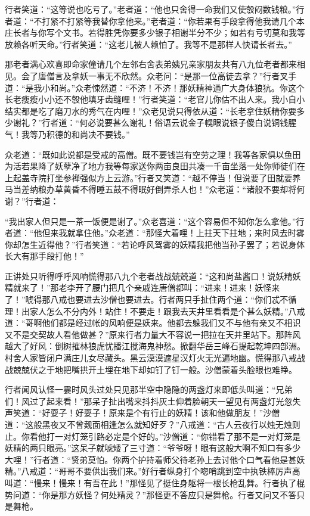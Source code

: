 \documentclass[12pt,UTF8]{ctexbook}
\begin{document}
行者笑道：“这等说也吃亏了。”老者道：“他也只舍得一命我们又使彀闷数钱粮。”行者道：“不打紧不打紧等我替你拿他来。”老者道：“你若果有手段拿得他我请几个本庄长者与你写个文书。若得胜凭你要多少银子相谢半分不少；如若有亏切莫和我等放赖各听天命。”行者笑道：“这老儿被人赖怕了。我等不是那样人快请长者去。”

那老者满心欢喜即命家僮请几个左邻右舍表弟姨兄亲家朋友共有八九位老者都来相见。会了唐僧言及拿妖一事无不欣然。众老问：“是那一位高徒去拿？”行者叉手道：“是我小和尚。”众老悚然道：“不济！不济！那妖精神通广大身体狼犺。你这个长老瘦瘦小小还不彀他填牙齿缝哩！”行者笑道：“老官儿你估不出人来。我小自小结实都是吃了磨刀水的秀气在内哩！”众老见说只得依从道：“长老拿住妖精你要多少谢礼？”行者道：“何必说要甚么谢礼！俗语云说金子幌眼说银子傻白说铜钱腥气！我等乃积德的和尚决不要钱。”

众老道：“既如此说都是受戒的高僧。既不要钱岂有空劳之理！我等各家俱以鱼田为活若果降了妖孽净了地方我等每家送你两亩良田共凑一千亩坐落一处你师徒们在上起盖寺院打坐参禅强似方上云游。”行者又笑道：“越不停当！但说要了田就要养马当差纳粮办草黄昏不得睡五鼓不得眠好倒弄杀人也！”众老道：“诸般不要却将何谢？”行者道：

“我出家人但只是一茶一饭便是谢了。”众老喜道：“这个容易但不知你怎么拿他。”行者道：“他但来我就拿住他。”众老道：“那怪大着哩！上拄天下拄地；来时风去时雾你却怎生近得他？”行者笑道：“若论呼风驾雾的妖精我把他当孙子罢了；若说身体长大有那手段打他！”

正讲处只听得呼呼风响慌得那八九个老者战战兢兢道：“这和尚盐酱口！说妖精妖精就来了！”那老李开了腰门把几个亲戚连唐僧都叫：“进来！进来！妖怪来了！”唬得那八戒也要进去沙僧也要进去。行者两只手扯住两个道：“你们忒不循理！出家人怎么不分内外！站住！不要走！跟我去天井里看看是个甚么妖精。”八戒道：“哥啊他们都是经过帐的风响便是妖来。他都去躲我们又不与他有亲又不相识又不是交契故人看他做甚？”原来行者力量大不容说一把拉在天井里站下。那阵风越大了好风：倒树摧林狼虎忧播江搅海鬼神愁。掀翻华岳三峰石提起乾坤四部洲。村舍人家皆闭户满庄儿女尽藏头。黑云漠漠遮星汉灯火无光遍地幽。慌得那八戒战战兢兢伏之于地把嘴拱开土埋在地下却如钉了钉一般。沙僧蒙着头脸眼也难睁。

行者闻风认怪一霎时风头过处只见那半空中隐隐的两盏灯来即低头叫道：“兄弟们！风过了起来看！”那呆子扯出嘴来抖抖灰土仰着脸朝天一望见有两盏灯光忽失声笑道：“好耍子！好耍子！原来是个有行止的妖精！该和他做朋友！”沙僧道：“这般黑夜又不曾觌面相逢怎么就知好歹？”八戒道：“古人云夜行以烛无烛则止。你看他打一对灯笼引路必定是个好的。”沙僧道：“你错看了那不是一对灯笼是妖精的两只眼亮。”这呆子就唬矮了三寸道：“爷爷呀！眼有这般大啊不知口有多少大哩！”行者道：“贤弟莫怕。你两个护持着师父待老孙上去讨他个口气看他是甚妖精。”八戒道：“哥哥不要供出我们来。”好行者纵身打个唿哨跳到空中执铁棒厉声高叫道：“慢来！慢来！有吾在此！”那怪见了挺住身躯将一根长枪乱舞。行者执了棍势问道：“你是那方妖怪？何处精灵？”那怪更不答应只是舞枪。行者又问又不答只是舞枪。
\end{document}

